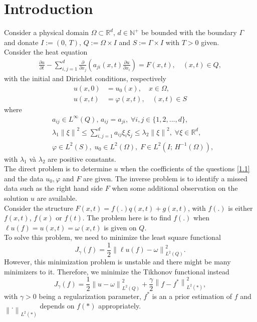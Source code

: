 \documentclass[]{article}
\begin{document}
\justifying

\thispagestyle{empty}
	
\newpage
\section{Introduction}
Consider a physical domain $\Omega \subset \mathbb{R}^d,\, d\in \mathbb{N^+}$ be bounded with the boundary $\Gamma$ and donate $I:=(0,\, T),\, Q:=\Omega\times I$ and $ S:=\Gamma \times I$ with $T>0$ given. 
\\
Consider the heat equation
\begin{align}\label{1.1}
	\frac{\partial u}{\partial t}-\sum_{i, j=1}^{d}\frac{\partial}{\partial x_j}\left(a_{ji}(x, t)\frac{\partial u}{\partial x_i}\right)=F(x, t), \quad(x, t)\in Q,
\end{align}
with the initial and Dirichlet conditions, respectively
\begin{align}
	u(x, 0)&=u_0(x),\quad x\in \Omega,\label{1.2}\\
	u(x, t)&=\varphi(x, t),\quad(x, t)\in S \label{1.3}
\end{align}
where
\begin{align*}
	&a_{ij}\in L^{\infty}(Q),\, a_{ij}=a_{ji},\; \forall i, j\in \{1, 2, ..., d\},\\
	&\lambda_1\left\|\xi\right\|^2\leq \sum_{i, j=1}^{d}a_{ij}\xi_i\xi_j\leq \lambda_2\left\|\xi\right\|^2,\; \forall \xi\in\mathbb{R}^d,\\
	&\varphi\in L^2(S),\; u_0\in L^2(\Omega),\; F\in L^2(I;\, H^{-1}(\Omega)),
\end{align*}
with $\lambda_1$ và $\lambda_2$ are positive constants.
\\
The direct problem is to determine $u$ when the coefficients of the questions \eqref{1.1} and the data $u_0, \varphi$ and $F$ are given. The inverse problem is to identify a missed data such as the right hand side $F$ when some additional observation on the solution $u$ are available. 
\\
Consider the structure $F(x, t)=f(.)q(x, t)+g(x, t)$, with $f(.)$ is either $f(x, t)$, $f(x)$ or $f(t)$. The problem here is to find $f(.)$ when $\ell u(f)=u(x, t)=\omega(x, t)$ is given on $Q$.
\\ To solve this problem, we need to minimize the least square functional 
$$J_{\gamma}(f)=\frac{1}{2}\left\|\ell u(f)-\omega\right\|_{L^2(Q)}^2.$$
However, this minimization problem is unstable and there might be many minimizers to it. Therefore, we minimize the Tikhonov functional instead
$$J_{\gamma}(f)=\frac{1}{2}\left\|u-\omega\right\|_{L^2(Q)}^2+\frac{\gamma}{2}\left\|f-f^*\right\|_{L^2(*)}^2,$$
with $\gamma>0$ being a regularization parameter, $f^*$ is an a prior estimation of $f$ and $\left\|.\right\|_{L^2(*)}$ depends on $f(*)$ appropriately.
\end{document}
